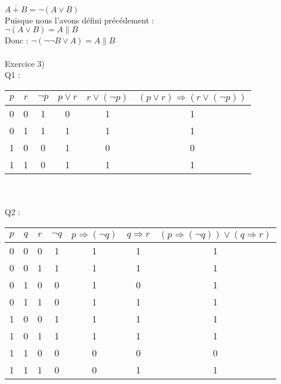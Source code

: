 \documentclass{article}
\begin{document}
\newline
\\
$\overline{A + B} = \neg (A \lor B)$
\newline
\\
Puisque nous l'avons défini précédement :
\newline
\\
$\neg (A \lor B) = A \parallel B$ 
\newline
\\
Donc : $\neg (\neg\neg B \lor A) = A \parallel B$
\newline
\\
\\
Exercice 3)
\newline
\\
Q1 :
\newline
\\
\begin{tabular}{|c|c|c|c|c|c|}
\hline
$p$ & $r$ & $\neg p$ & $p \lor r$ & $r \lor (\neg p)$ & $(p \lor r) \Rightarrow (r \lor (\neg p))$ \\ 
\hline
0 & 0 & 1 & 0 & 1 & 1 \\ 
\hline
0 & 1 & 1 & 1 & 1 & 1 \\ 
\hline
1 & 0 & 0 & 1 & 0 & 0 \\ 
\hline
1 & 1 & 0 & 1 & 1 & 1 \\ 
\hline
\end{tabular}
\vspace*{3mm}
\newline
\\
\\
Q2 :
\newline
\\
\begin{tabular}{|c|c|c|c|c|c|c|}
\hline
$p$ & $q$ & $r$ & $\neg q$ & $p \Rightarrow (\neg q)$ & $q \Rightarrow r$ & $(p \Rightarrow (\neg q)) \lor (q \Rightarrow r)$ \\ 
\hline
0 & 0 & 0 & 1 & 1 & 1 & 1 \\ 
\hline
0 & 0 & 1 & 1 & 1 & 1 & 1 \\ 
\hline
0 & 1 & 0 & 0 & 1 & 0 & 1 \\ 
\hline
0 & 1 & 1 & 0 & 1 & 1 & 1 \\ 
\hline
1 & 0 & 0 & 1 & 1 & 1 & 1 \\ 
\hline
1 & 0 & 1 & 1 & 1 & 1 & 1 \\ 
\hline
1 & 1 & 0 & 0 & 0 & 0 & 0 \\ 
\hline
1 & 1 & 1 & 0 & 0 & 1 & 1 \\ 
\hline
\end{tabular}
\end{document}

